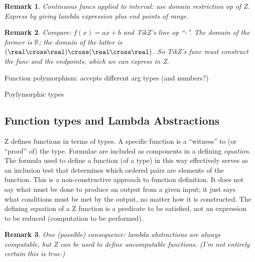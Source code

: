 \documentclass[12pt]{tufte-handout}
\numberwithin{equation}{subsection}
\numberwithin{equation}{subsection}
\newtheorem{remark}{Remark}
\newcommand\R{\(\mathds{R}\)}
\begin{document}
  \begin{remark}
    Continuous funcs applied to interval: use domain restriction op of
    Z.  Express by giving lambda expression plus end points of range.
  \end{remark}

  \begin{remark}
    Compare: \(f(x) = ax + b\) and TikZ's line op ``-\-''.  The domain
    of the former is \R{}; the domain of the latter is
    \((\real\cross\real)\cross(\real\cross\real)\).  So TikZ's func must
    construct the func and the endpoints, which we can express in Z.
  \end{remark}

  Function polymorphism: accepts different arg types (and numbers?)

  Poylymorphic types

  \subsection{Function types and Lambda Abstractions}
  \label{subs:functypes}

  Z defines functions in terms of types.  A specific function is a
  ``witness'' to (or ``proof'' of) the type.  Formulae are included as
  components in a defining \textit{equation}.  The formula used to
  define a function (of a type) in this way effectively serves as an
  inclusion test that determines which ordered pairs are elements of
  the function.  This is a non-constructive approach to function
  definition.  It does not say what must be done to produce an output
  from a given input; it just says what conditions must be met by the
  output, no matter how it is constructed.  The defining equation of a
  Z function is a predicate to be satisfied, not an expression to be
  reduced (computation to be performed).

  \begin{remark}
    One (possible) consequence: lambda abstractions are always
    computable, but Z can be used to define uncomputable functions.
    (I'm not entirely certain this is true.)
  \end{remark}
\end{document}
